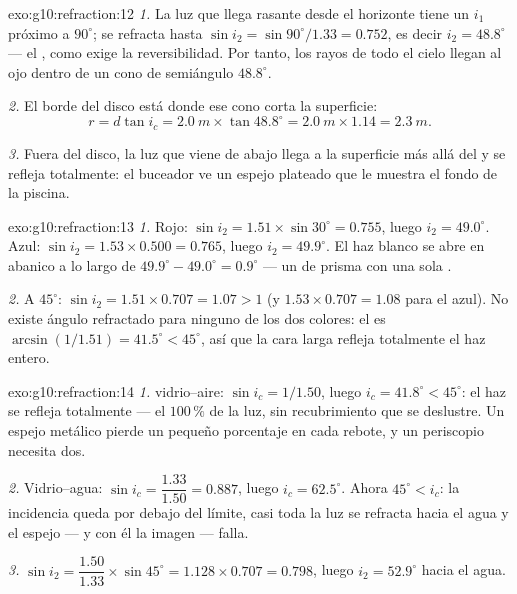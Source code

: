 \begin{solution}{exo:g10:refraction:12}
\emph{1.} La luz que llega rasante desde el horizonte tiene un $i_1$
próximo a $90^\circ$; se refracta hasta
$\sin i_2 = \sin 90^\circ / 1.33 = 0.752$, es decir $i_2 = 48.8^\circ$
--- el , como exige la reversibilidad. Por tanto, los rayos
de todo el cielo llegan al ojo dentro de un cono de semiángulo
$48.8^\circ$.

\emph{2.} El borde del disco está donde ese cono corta la superficie:
\[
r = d \tan i_c = \qty{2.0}{m} \times \tan 48.8^\circ
= \qty{2.0}{m} \times 1.14 = \qty{2.3}{m}.
\]

\emph{3.} Fuera del disco, la luz que viene de abajo llega a la
superficie más allá del  y se refleja totalmente: el
buceador ve un espejo plateado que le muestra el fondo de la piscina.
\end{solution}

\begin{solution}{exo:g10:refraction:13}
\emph{1.} Rojo: $\sin i_2 = 1.51 \times \sin 30^\circ = 0.755$, luego
$i_2 = 49.0^\circ$. Azul: $\sin i_2 = 1.53 \times 0.500 = 0.765$, luego
$i_2 = 49.9^\circ$. El haz blanco se abre en abanico a lo largo de
$49.9^\circ - 49.0^\circ = 0.9^\circ$ --- un  de prisma con una
sola .

\emph{2.} A $45^\circ$: $\sin i_2 = 1.51 \times 0.707 = 1.07 > 1$ (y
$1.53 \times 0.707 = 1.08$ para el azul). No existe ángulo refractado
para ninguno de los dos colores: el  es
$\arcsin(1/1.51) = 41.5^\circ < 45^\circ$, así que la cara larga refleja
totalmente el haz entero.
\end{solution}

\begin{solution}{exo:g10:refraction:14}
\emph{1.}  vidrio--aire: $\sin i_c = 1/1.50$, luego
$i_c = 41.8^\circ < 45^\circ$: el haz se refleja totalmente --- el
$100\,\%$ de la luz, sin recubrimiento que se deslustre. Un espejo
metálico pierde un pequeño porcentaje en cada rebote, y un periscopio
necesita dos.

\emph{2.} Vidrio--agua: $\sin i_c = \dfrac{1.33}{1.50} = 0.887$, luego
$i_c = 62.5^\circ$. Ahora $45^\circ < i_c$: la incidencia queda por
debajo del límite, casi toda la luz se refracta hacia el agua y el
espejo --- y con él la imagen --- falla.

\emph{3.} $\sin i_2 = \dfrac{1.50}{1.33} \times \sin 45^\circ
= 1.128 \times 0.707 = 0.798$, luego $i_2 = 52.9^\circ$ hacia el agua.
\end{solution}

